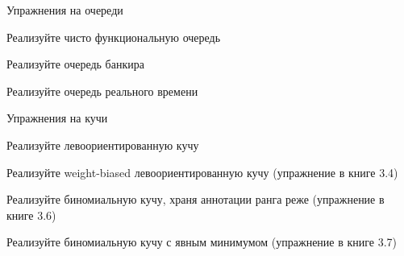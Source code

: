 \begin{frame}{Упражнения на очереди}
\begin{exercise}[\exscore{2}{2}{1}]
Реализуйте чисто функциональную очередь
\end{exercise}

\begin{exercise}[\exscore{2}{2}{1}]
Реализуйте очередь банкира
\end{exercise}

\begin{exercise}[\exscore{2}{2}{1}]
Реализуйте очередь реального времени
\end{exercise}
\end{frame}


%
%
%



\begin{frame}{Упражнения на кучи}
\begin{exercise}[\exscore{2}{2}{1}]
Реализуйте левоориентированную кучу
\end{exercise}

\begin{exercise}[\exscore{2}{2}{1}]
Реализуйте weight-biased левоориентированную кучу (упражнение в книге 3.4)
\end{exercise}


\begin{exercise}[\exscore{3}{3}{1}]
Реализуйте биномиальную кучу, храня аннотации ранга реже (упражнение в книге 3.6)
\end{exercise}

\begin{exercise}[\exscore{2}{2}{1}]
Реализуйте биномиальную кучу с явным минимумом (упражнение в книге 3.7)
\end{exercise}

\end{frame}


